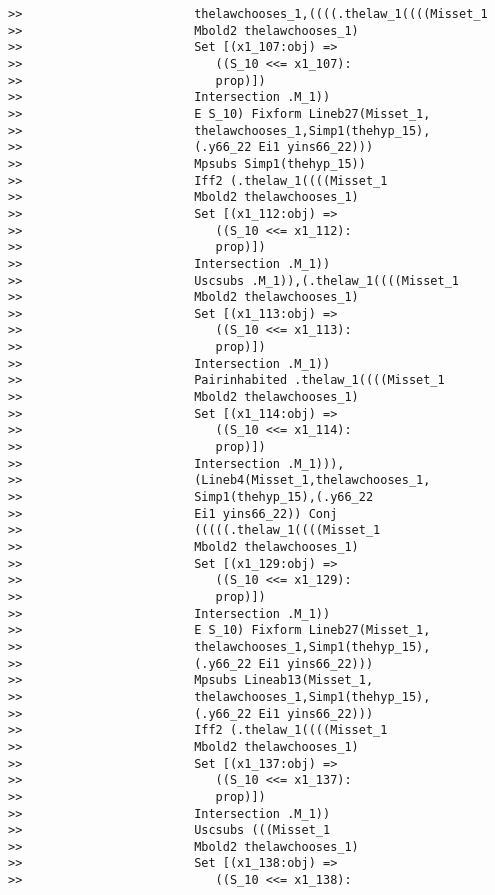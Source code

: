 \documentclass[12pt]{article}
\begin{document}
\begin{verbatim}
>>                        thelawchooses_1,((((.thelaw_1((((Misset_1
>>                        Mbold2 thelawchooses_1)
>>                        Set [(x1_107:obj) =>
>>                           ((S_10 <<= x1_107):
>>                           prop)])
>>                        Intersection .M_1))
>>                        E S_10) Fixform Lineb27(Misset_1,
>>                        thelawchooses_1,Simp1(thehyp_15),
>>                        (.y66_22 Ei1 yins66_22)))
>>                        Mpsubs Simp1(thehyp_15))
>>                        Iff2 (.thelaw_1((((Misset_1
>>                        Mbold2 thelawchooses_1)
>>                        Set [(x1_112:obj) =>
>>                           ((S_10 <<= x1_112):
>>                           prop)])
>>                        Intersection .M_1))
>>                        Uscsubs .M_1)),(.thelaw_1((((Misset_1
>>                        Mbold2 thelawchooses_1)
>>                        Set [(x1_113:obj) =>
>>                           ((S_10 <<= x1_113):
>>                           prop)])
>>                        Intersection .M_1))
>>                        Pairinhabited .thelaw_1((((Misset_1
>>                        Mbold2 thelawchooses_1)
>>                        Set [(x1_114:obj) =>
>>                           ((S_10 <<= x1_114):
>>                           prop)])
>>                        Intersection .M_1))),
>>                        (Lineb4(Misset_1,thelawchooses_1,
>>                        Simp1(thehyp_15),(.y66_22
>>                        Ei1 yins66_22)) Conj
>>                        (((((.thelaw_1((((Misset_1
>>                        Mbold2 thelawchooses_1)
>>                        Set [(x1_129:obj) =>
>>                           ((S_10 <<= x1_129):
>>                           prop)])
>>                        Intersection .M_1))
>>                        E S_10) Fixform Lineb27(Misset_1,
>>                        thelawchooses_1,Simp1(thehyp_15),
>>                        (.y66_22 Ei1 yins66_22)))
>>                        Mpsubs Lineab13(Misset_1,
>>                        thelawchooses_1,Simp1(thehyp_15),
>>                        (.y66_22 Ei1 yins66_22)))
>>                        Iff2 (.thelaw_1((((Misset_1
>>                        Mbold2 thelawchooses_1)
>>                        Set [(x1_137:obj) =>
>>                           ((S_10 <<= x1_137):
>>                           prop)])
>>                        Intersection .M_1))
>>                        Uscsubs (((Misset_1
>>                        Mbold2 thelawchooses_1)
>>                        Set [(x1_138:obj) =>
>>                           ((S_10 <<= x1_138):

\end{verbatim}
\end{document}
